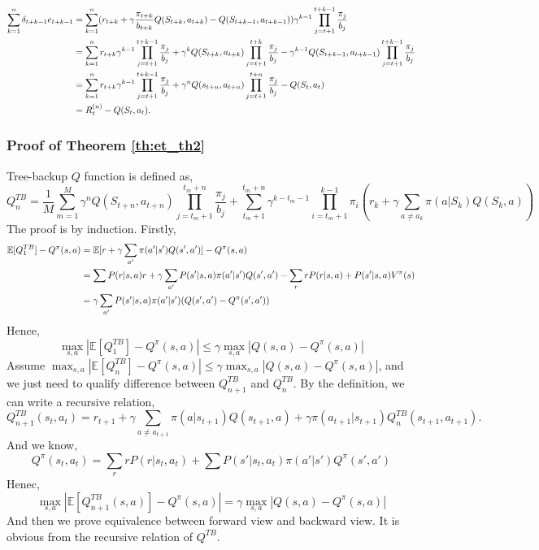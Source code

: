 \documentclass[11pt,a4paper]{article}
\def\E{\mathbb{E}}
\begin{document}
\begin{equation}
\aligned 
\sum_{k=1}^n \delta_{t+k-1}e_{t+k-1} & = \sum_{k=1}^n (r_{t+k} + \gamma \frac{\pi_{t+k}}{b_{t+k}}Q(S_{t+k}, a_{t+k})-Q(S_{t+k-1}, a_{t+k-1}))\gamma^{k-1} \prod_{j=t+1}^{t+k-1} \frac{\pi_j}{b_j} \\
& = \sum_{k=1}^n r_{t+k} \gamma^{k-1} \prod_{j=t+1}^{t+k-1} \frac{\pi_j}{b_j} + \gamma^k Q(S_{t+k}, a_{t+k}) \prod_{j=t+1}^{t+k}\frac{\pi_j}{b_j}-\gamma^{k-1}Q(S_{t+k-1},a_{t+k-1})\prod_{j=t+1}^{t+k-1}\frac{\pi_j}{b_j} \\ 
& = \sum_{k=1}^n r_{t+k} \gamma^{k-1} \prod_{j=t+1}^{t+k-1} \frac{\pi_j}{b_j} + \gamma^n Q(s_{t+n},a_{t+n}) \prod_{j=t+1}^{t+n}\frac{\pi_j}{b_j} - Q(S_t,a_t) \\ 
& = R_t^{(n)} - Q(S_t,a_t).
\endaligned 
\end{equation}

\subsubsection{Proof of Theorem \ref{th:et_th2}}
Tree-backup $Q$ function is defined as, 
\begin{equation}
Q^{TB}_n = \frac{1}{M} \sum_{m=1}^M \gamma^n Q(S_{t+n}, a_{t+n}) \prod_{j=t_m+1}^{t_m+n}\frac{\pi_j}{b_j} + \sum_{t_m+1}^{t_m+n} \gamma^{k-t_m-1}\prod_{i=t_m+1}^{k-1} \pi_i(r_k + \gamma \sum_{a\neq a_k}\pi(a|S_k)Q(S_k,a))
\end{equation}
The proof is by induction. Firstly,
\begin{equation}
    \aligned 
    \E[Q^{TB}_1] - Q^{\pi}(s,a) & = \E[r + \gamma\sum_{a'} \pi(a'|s')Q(s',a')] -Q^{\pi}(s,a)\\ 
    & = \sum P(r|s,a)r + \gamma\sum_{a'}P(s'|s,a)\pi(a'|s')Q(s',a') - \sum_r rP(r|s,a) + P(s'|s,a)V^{\pi}(s)\\ 
    & = \gamma \sum_{a'}P(s'|s,a)\pi(a'|s')(Q(s',a') - Q^{\pi}(s',a')) 
    \endaligned
\end{equation}
Hence,
\begin{equation}
    \max_{s,a}|\E[Q^{TB}_1] - Q^{\pi}(s,a)| \le \gamma \max_{s,a}|Q(s,a) - Q^{\pi}(s,a)|
\end{equation}
Assume $\max_{s,a}|\E[Q^{TB}_n] - Q^{\pi}(s,a)| \le \gamma \max_{s,a}|Q(s,a) - Q^{\pi}(s,a)|$, and we just need to qualify difference between $Q^{TB}_{n+1}$ and $Q^{TB}_n$. By the definition, we can write a recursive relation,
\begin{equation}
Q^{TB}_{n+1}(s_t,a_t) = r_{t+1} + \gamma \sum_{a\neq a_{t+1}} \pi(a|s_{t+1})Q(s_{t+1}, a) + \gamma \pi(a_{t+1}|s_{t+1})Q_{n}^{TB}(s_{t+1},a_{t+1}).
\end{equation}
And we know, 
\begin{equation}
Q^{\pi}(s_t,a_t) = \sum_r rP(r|s_t,a_t) + \sum P(s'|s_t,a_t)\pi(a'|s')Q^{\pi}(s',a')
\end{equation}
Henec, 
\begin{equation}
    \max_{s,a}|\E[Q^{TB}_{n+1}(s,a)] - Q^{\pi}(s,a)| = \gamma \max_{s,a} |Q(s,a) - Q^{\pi}(s,a)|
\end{equation}
And then we prove equivalence between forward view and backward view. It is obvious from the recursive relation of $Q^{TB}$.
\end{document}
